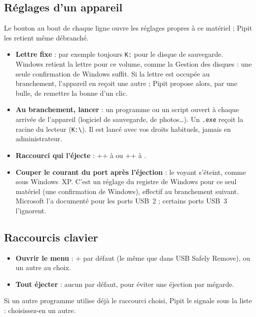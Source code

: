 \subsection{Réglages d'un appareil}
Le bouton  au bout de chaque ligne ouvre les réglages propres à ce
matériel ; Pipit les retient même débranché.

\begin{itemize}
\item \textbf{Lettre fixe} : par exemple toujours \texttt{K:} pour le disque de sauvegarde.
  Windows retient la lettre pour ce volume, comme la Gestion des disques : une seule
  confirmation de Windows suffit. Si la lettre est occupée au branchement, l'appareil en
  reçoit une autre ; Pipit propose alors, par une bulle, de remettre la bonne d'un clic.
\item \textbf{Au branchement, lancer} : un programme ou un script ouvert à chaque arrivée
  de l'appareil (logiciel de sauvegarde, de photos…). Un \texttt{.exe} reçoit la racine du
  lecteur (\texttt{K:\textbackslash}). Il est lancé avec vos droits habituels, jamais en
  administrateur.
\item \textbf{Raccourci qui l'éjecte} : ++ à
   ou ++ à .
\item \textbf{Couper le courant du port après l'éjection} : le voyant s'éteint, comme sous
  Windows~XP. C'est un réglage du registre de Windows pour ce seul matériel (une
  confirmation de Windows), effectif au branchement suivant. Microsoft l'a documenté pour
  les ports USB~2 ; certains ports USB~3 l'ignorent.
\end{itemize}

\subsection{Raccourcis clavier}
\begin{itemize}
\item \textbf{Ouvrir le menu} : + par défaut (le même que dans
  USB Safely Remove), ou un autre au choix.
\item \textbf{Tout éjecter} : aucun par défaut, pour éviter une éjection par mégarde.
\end{itemize}
Si un autre programme utilise déjà le raccourci choisi, Pipit le signale sous la liste :
choisissez-en un autre.

